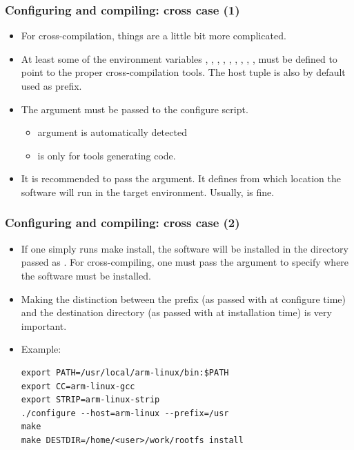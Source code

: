 \begin{frame}
  \frametitle{Configuring and compiling: cross case (1)}
  \begin{itemize}
  \item For cross-compilation, things are a little bit more complicated.
  \item At least some of the environment variables ,
    , , , , ,
    , , ,  must be
    defined to point to the proper cross-compilation tools. The host
    tuple is also by default used as prefix.
  \item The  argument must be passed to the configure script.
    \begin{itemize}
    \item {} argument is automatically detected
    \item {} is only for tools generating code.
    \end{itemize}
  \item It is recommended to pass the  argument. It
    defines from which location the software will run in the target
    environment. Usually,  is fine.
  \end{itemize}
\end{frame}

\begin{frame}[fragile]
  \frametitle{Configuring and compiling: cross case (2)}
  \begin{itemize}
  \item If one simply runs make install, the software will be
    installed in the directory passed as . For
    cross-compiling, one must pass the  argument to
    specify where the software must be installed.
  \item Making the distinction between the prefix (as passed with
     at configure time) and the destination directory (as
    passed with  at installation time) is very important.
  \item Example:
\small
\begin{block}{}
\begin{verbatim}
export PATH=/usr/local/arm-linux/bin:$PATH
export CC=arm-linux-gcc
export STRIP=arm-linux-strip
./configure --host=arm-linux --prefix=/usr
make
make DESTDIR=/home/<user>/work/rootfs install
\end{verbatim}
\end{block}
  \end{itemize}
\end{frame}

